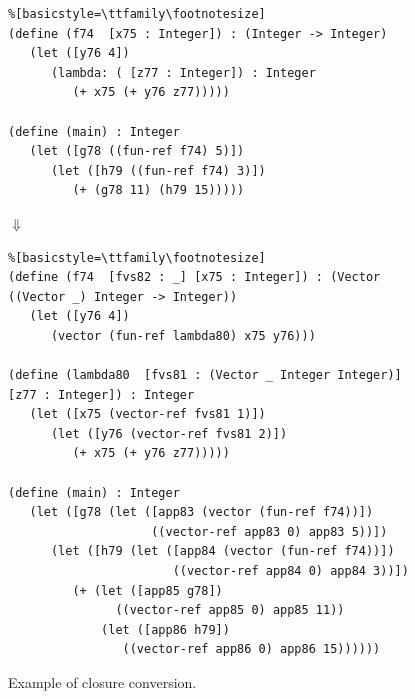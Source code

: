 \documentclass[11pt]{book}
\begin{document}
\begin{figure}[h]
  \begin{minipage}{0.8\textwidth}
\begin{lstlisting}%[basicstyle=\ttfamily\footnotesize]
(define (f74  [x75 : Integer]) : (Integer -> Integer)
   (let ([y76 4])
      (lambda: ( [z77 : Integer]) : Integer
         (+ x75 (+ y76 z77)))))

(define (main) : Integer
   (let ([g78 ((fun-ref f74) 5)])
      (let ([h79 ((fun-ref f74) 3)])
         (+ (g78 11) (h79 15)))))
\end{lstlisting}
$\Downarrow$
\begin{lstlisting}%[basicstyle=\ttfamily\footnotesize]
(define (f74  [fvs82 : _] [x75 : Integer]) : (Vector ((Vector _) Integer -> Integer))
   (let ([y76 4])
      (vector (fun-ref lambda80) x75 y76)))

(define (lambda80  [fvs81 : (Vector _ Integer Integer)] [z77 : Integer]) : Integer
   (let ([x75 (vector-ref fvs81 1)])
      (let ([y76 (vector-ref fvs81 2)])
         (+ x75 (+ y76 z77)))))

(define (main) : Integer
   (let ([g78 (let ([app83 (vector (fun-ref f74))])
                    ((vector-ref app83 0) app83 5))])
      (let ([h79 (let ([app84 (vector (fun-ref f74))])
                       ((vector-ref app84 0) app84 3))])
         (+ (let ([app85 g78])
               ((vector-ref app85 0) app85 11))
             (let ([app86 h79])
                ((vector-ref app86 0) app86 15))))))
\end{lstlisting}
\end{minipage}

\caption{Example of closure conversion.}
\label{fig:lexical-functions-example}
\end{figure}
\end{document}
